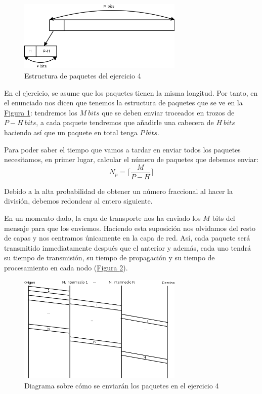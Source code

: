 \documentclass[10pt,a4paper,spanish]{report}
\begin{document}
\begin{figure}[!h]
  \centering
  \includegraphics[width=0.7\textwidth]{ejercicio4}
  \caption{Estructura de paquetes del ejercicio 4}
  \label{ejer4}
\end{figure}

En el ejercicio, se asume que los paquetes tienen la misma longitud. Por tanto, en el enunciado nos dicen que tenemos la estructura de paquetes que se ve en la \hyperref[ejer4]{Figura \ref*{ejer4}}: tendremos los $M~bits$ que se deben enviar troceados en trozos de $P-H~bits$, a cada paquete tendremos que añadirle una cabecera de $H~bits$ haciendo así que un paquete en total tenga $P~bits$.


Para poder saber el tiempo que vamos a tardar en enviar todos los paquetes necesitamos, en primer lugar, calcular el número de paquetes que debemos enviar:
\begin{displaymath}
  N_p = \Bigg\lceil \frac{M}{P-H} \Bigg\rceil
\end{displaymath} 

Debido a la alta probabilidad de obtener un número fraccional al hacer la división, debemos redondear al entero siguiente.

En un momento dado, la capa de transporte nos ha enviado los $M$ bits del mensaje para que los enviemos. Haciendo esta suposición nos olvidamos del resto de capas y nos centramos únicamente en la capa de red. Así, cada paquete será transmitido inmediatamente después que el anterior y además, cada uno tendrá su tiempo de transmisión, su tiempo de propagación y su tiempo de procesamiento en cada nodo (\hyperref[ejercicio4-1]{Figura \ref*{ejercicio4-1}}).

\begin{figure}[!h]
  \centering
  \includegraphics[width=0.7\textwidth]{diagramaejer4-1}
  \caption{Diagrama sobre cómo se enviarán los paquetes en el ejercicio 4}
  \label{ejercicio4-1}
\end{figure}
\end{document}
